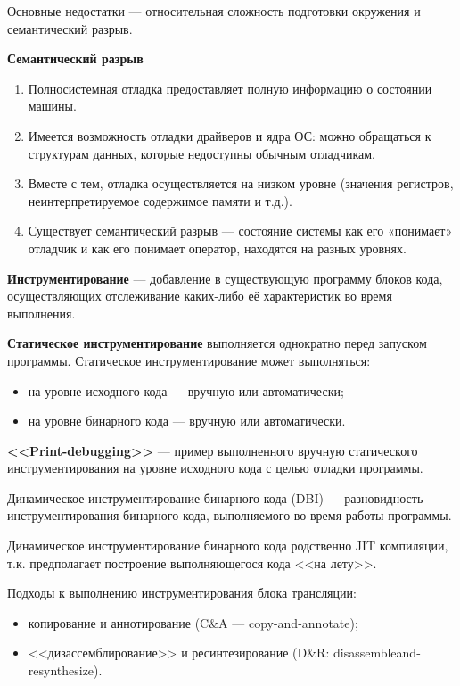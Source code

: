 Основные недостатки — относительная сложность подготовки окружения и семантический разрыв.

\textbf{Семантический разрыв}
\begin{enumerate}
    \item Полносистемная отладка предоставляет полную информацию о состоянии машины.
    \item Имеется возможность отладки драйверов и ядра ОС: можно обращаться к структурам данных, которые недоступны обычным отладчикам.
    \item  Вместе с тем, отладка осуществляется на низком уровне (значения регистров, неинтерпретируемое содержимое памяти и т.д.).
    \item Существует семантический разрыв — состояние системы как его «понимает» отладчик и как его понимает оператор, находятся на разных уровнях.
\end{enumerate}

\textbf{Инструментирование} — добавление в существующую программу блоков кода,
осуществляющих отслеживание каких-либо её характеристик во время выполнения.

\textbf{Статическое инструментирование} выполняется однократно перед запуском
программы. Статическое инструментирование может выполняться:
\begin{itemize}
    \item на уровне исходного кода — вручную или автоматически;
    \item на уровне бинарного кода — вручную или автоматически.
\end{itemize}

\textbf{<<Print-debugging>>} — пример выполненного вручную статического инструментирования на уровне исходного кода с целью отладки программы.

Динамическое инструментирование бинарного кода (DBI) — разновидность инструментирования бинарного кода, выполняемого во время работы программы.

Динамическое инструментирование бинарного кода родственно JIT компиляции, т.к. предполагает построение выполняющегося кода <<на лету>>.

Подходы к выполнению инструментирования блока трансляции:
\begin{itemize}
    \item копирование и аннотирование (C\&A — copy-and-annotate);
    \item <<дизассемблирование>> и ресинтезирование (D\&R: disassembleand-resynthesize).
\end{itemize}

